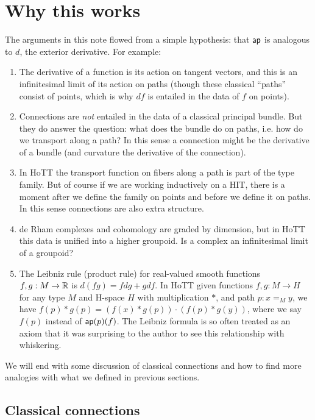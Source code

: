 \section{Why this works}

The arguments in this note flowed from a simple hypothesis: that \( \mathsf{ap} \) is analogous to \( d \), the exterior derivative. For example:

\begin{enumerate}
\item The derivative of a function is its action on tangent vectors, and this is an infinitesimal limit of its action on paths (though these classical ``paths'' consist of points, which is why \( df \) is entailed in the data of \( f \) on points).
\item Connections are \emph{not} entailed in the data of a classical principal bundle. But they do answer the question: what does the bundle do on paths, i.e. how do we transport along a path? In this sense a connection might be the derivative of a bundle (and curvature the derivative of the connection).
\item In HoTT the transport function on fibers along a path is part of the type family. But of course if we are working inductively on a HIT, there is a moment after we define the family on points and before we define it on paths. In this sense connections are also extra structure.
\item de Rham complexes and cohomology are graded by dimension, but in HoTT this data is unified into a higher groupoid. Is a complex an infinitesimal limit of a groupoid?
\item The Leibniz rule (product rule) for real-valued smooth functions \( f,g:M\to\mathbb{R} \) is \( d(fg)=fdg + gdf \). In HoTT given functions \( f,g:M\to H \) for any type \( M \) and H-space \( H \) with multiplication \( * \), and path \( p:x=_M y \), we have \( f(p)* g(p) = (f(x)* g(p))\cdot (f(p)*g(y)) \), where we say \( f(p) \) instead of \( \mathsf{ap}(p)(f) \). The Leibniz formula is so often treated as an axiom that it was surprising to the author to see this relationship with whiskering.
\end{enumerate}

We will end with some discussion of classical connections and how to find more analogies with what we defined in previous sections.

\subsection{Classical connections}

